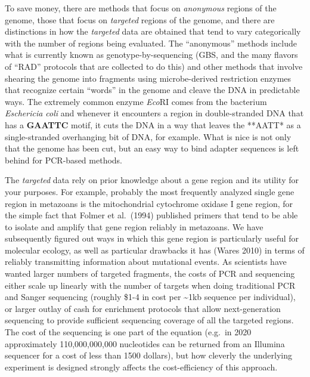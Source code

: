\documentclass[
]{article}
\begin{document}
To save money, there are methods that focus on \emph{anonymous} regions
of the genome, those that focus on \emph{targeted} regions of the
genome, and there are distinctions in how the \emph{targeted} data are
obtained that tend to vary categorically with the number of regions
being evaluated. The ``anonymous'' methods include what is currently
known as genotype-by-sequencing (GBS, and the many flavors of ``RAD''
protocols that are collected to do this) and other methods that involve
shearing the genome into fragments using microbe-derived restriction
enzymes that recognize certain ``words'' in the genome and cleave the
DNA in predictable ways. The extremely common enzyme \emph{Eco}RI comes
from the bacterium \emph{Eschericia coli} and whenever it encounters a
region in double-stranded DNA that has a \textbf{GAATTC} motif, it cuts
the DNA in a way that leaves the **AATT* as a single-stranded
overhanging bit of DNA, for example. What is nice is not only that the
genome has been cut, but an easy way to bind adapter sequences is left
behind for PCR-based methods.

The \emph{targeted} data rely on prior knowledge about a gene region and
its utility for your purposes. For example, probably the most frequently
analyzed single gene region in metazoans is the mitochondrial cytochrome
oxidase I gene region, for the simple fact that Folmer et al.~(1994)
published primers that tend to be able to isolate and amplify that gene
region reliably in metazoans. We have subsequently figured out ways in
which this gene region is particularly useful for molecular ecology, as
well as particular drawbacks it has (Wares 2010) in terms of reliably
transmitting information about mutational events. As scientists have
wanted larger numbers of targeted fragments, the costs of PCR and
sequencing either scale up linearly with the number of targets when
doing traditional PCR and Sanger sequencing (roughly \$1-4 in cost per
\textasciitilde1kb sequence per individual), or larger outlay of cash
for enrichment protocols that allow next-generation sequencing to
provide sufficient sequencing coverage of all the targeted regions. The
cost of the sequencing is one part of the equation (e.g.~in 2020
approximately 110,000,000,000 nucleotides can be returned from an
Illumina sequencer for a cost of less than 1500 dollars), but how
cleverly the underlying experiment is designed strongly affects the
cost-efficiency of this approach.
\end{document}
